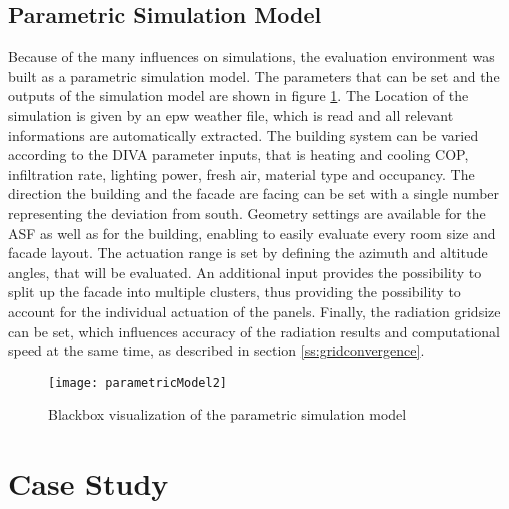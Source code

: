 			

		\subsection{Parametric Simulation Model}

			Because of the many influences on simulations, the evaluation environment was built as a parametric simulation model. The parameters that can be set and the outputs of the simulation model are shown in figure \ref{fig:parametricModel}. The Location of the simulation is given by an epw weather file, which is read and all relevant informations are automatically extracted. The building system can be varied according to the DIVA parameter inputs, that is heating and cooling COP, infiltration rate, lighting power, fresh air, material type and occupancy. The direction the building and the facade are facing can be set with a single number representing the deviation from south. Geometry settings are available for the ASF as well as for the building, enabling to easily evaluate every room size and facade layout. The actuation range is set by defining the azimuth and altitude angles, that will be evaluated. An additional input provides the possibility to split up the facade into multiple clusters, thus providing the possibility to account for the individual actuation of the panels. Finally, the radiation gridsize can be set, which influences accuracy of the radiation results and computational speed at the same time, as described in section \ref{ss:gridconvergence}. 

			\begin{figure}[ht] %
				\begin{center}
				\texttt{[image: parametricModel2]}
				\caption{Blackbox visualization of the parametric simulation model}
				\label{fig:parametricModel}
				\end{center} 
			\end{figure}

	\section{Case Study}

